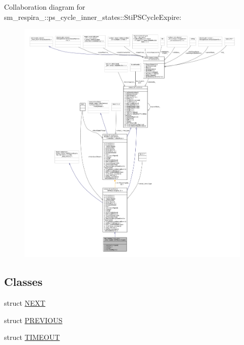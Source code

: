 Collaboration diagram for sm\+\_\+respira\+\_\+:\+:ps\+\_\+cycle\+\_\+inner\+\_\+states\+:\+:Sti\+P\+S\+Cycle\+Expire\+:
\nopagebreak
\begin{figure}[H]
\begin{center}
\leavevmode
\includegraphics[width=350pt]{structsm__respira__1_1_1ps__cycle__inner__states_1_1StiPSCycleExpire__coll__graph}
\end{center}
\end{figure}
\subsection*{Classes}
\begin{DoxyCompactItemize}
\item 
struct \hyperlink{structsm__respira__1_1_1ps__cycle__inner__states_1_1StiPSCycleExpire_1_1NEXT}{N\+E\+XT}
\item 
struct \hyperlink{structsm__respira__1_1_1ps__cycle__inner__states_1_1StiPSCycleExpire_1_1PREVIOUS}{P\+R\+E\+V\+I\+O\+US}
\item 
struct \hyperlink{structsm__respira__1_1_1ps__cycle__inner__states_1_1StiPSCycleExpire_1_1TIMEOUT}{T\+I\+M\+E\+O\+UT}
\end{DoxyCompactItemize}
